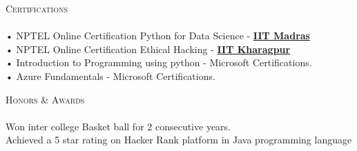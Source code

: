 \documentclass[a4paper]{article}
\newcommand{\lineunder} {
    \vspace*{-8pt} \\
    \hspace*{-18pt} \hrulefill \\
}
\newcommand{\header} [1] {
    {\hspace*{-18pt}\vspace*{6pt} \textsc{#1}}
    \vspace*{-6pt} \lineunder
}
\begin{document}
      \header{Certifications}
      \vspace{2mm}
      • NPTEL Online Certification Python for Data Science - \textbf{\href{https://drive.google.com/file/d/18eUHqC2QtSAs2ADX401i\_NORVOAxcpkN/view?usp=share\_link}{IIT Madras}}\\
\vspace*{1mm}
      • NPTEL Online Certification Ethical Hacking - \textbf{\href{https://drive.google.com/file/d/18c0hokOsa4\_ATjbI7dFbXX0rOkJf4xv8/view?usp=share\_link}{IIT Kharagpur}}\\
\vspace*{1mm}
      • Introduction to Programming using python - Microsoft Certifications.\\
\vspace*{1mm}
      • Azure Fundamentals - Microsoft Certifications.\\
\vspace*{1mm}
      \vspace{2mm}

\header{Honors \& Awards}
      \vspace{2mm} 
      Won inter college Basket ball for 2 consecutive years.\\
\vspace*{1mm}
      Achieved a 5 star rating on Hacker Rank platform in Java programming language\\
\vspace*{1mm}

    \ 
    
\end{document}
